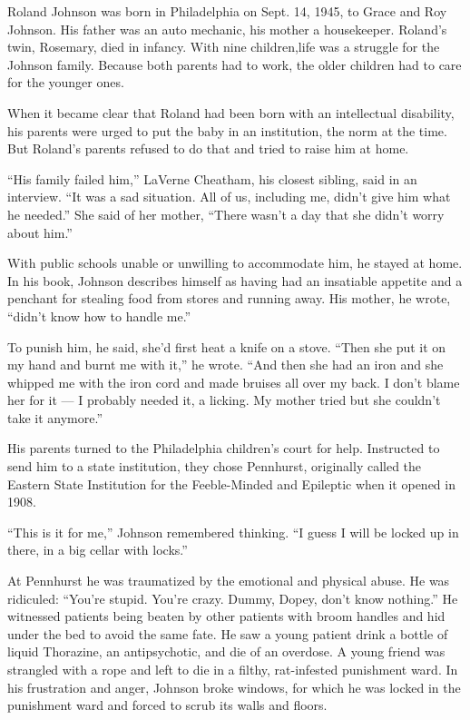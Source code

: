 Roland Johnson was born in Philadelphia on Sept. 14, 1945, to Grace and
Roy Johnson. His father was an auto mechanic, his mother a housekeeper.
Roland's twin, Rosemary, died in infancy. With nine children,life was a
struggle for the Johnson family. Because both parents had to work, the
older children had to care for the younger ones.

When it became clear that Roland had been born with an intellectual
disability, his parents were urged to put the baby in an institution,
the norm at the time. But Roland's parents refused to do that and tried
to raise him at home.

``His family failed him,'' LaVerne Cheatham, his closest sibling, said
in an interview. ``It was a sad situation. All of us, including me,
didn't give him what he needed.'' She said of her mother, ``There wasn't
a day that she didn't worry about him.''

With public schools unable or unwilling to accommodate him, he stayed at
home. In his book, Johnson describes himself as having had an insatiable
appetite and a penchant for stealing food from stores and running away.
His mother, he wrote, ``didn't know how to handle me.''

To punish him, he said, she'd first heat a knife on a stove. ``Then she
put it on my hand and burnt me with it,'' he wrote. ``And then she had
an iron and she whipped me with the iron cord and made bruises all over
my back. I don't blame her for it --- I probably needed it, a licking.
My mother tried but she couldn't take it anymore.''

His parents turned to the Philadelphia children's court for help.
Instructed to send him to a state institution, they chose Pennhurst,
originally called the Eastern State Institution for the Feeble-Minded
and Epileptic when it opened in 1908.

``This is it for me,'' Johnson remembered thinking. ``I guess I will be
locked up in there, in a big cellar with locks.''

At Pennhurst he was traumatized by the emotional and physical abuse. He
was ridiculed: ``You're stupid. You're crazy. Dummy, Dopey, don't know
nothing.'' He witnessed patients being beaten by other patients with
broom handles and hid under the bed to avoid the same fate. He saw a
young patient drink a bottle of liquid Thorazine, an antipsychotic, and
die of an overdose. A young friend was strangled with a rope and left to
die in a filthy, rat-infested punishment ward. In his frustration and
anger, Johnson broke windows, for which he was locked in the punishment
ward and forced to scrub its walls and floors.


